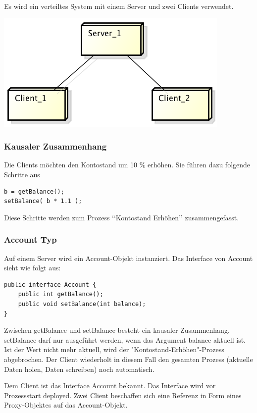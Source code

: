 \documentclass{article}
\begin{document}
Es wird ein verteiltes System mit einem Server und zwei Clients verwendet.
\begin{center}
\includegraphics[scale=0.85]{Deployment.png}
\end{center}

\subsubsection{Kausaler Zusammenhang}
\label{sec:kaus-zusamm}

Die Clients möchten den Kontostand um 10 \% erhöhen. Sie führen dazu folgende Schritte aus
\begin{lstlisting}
b = getBalance();
setBalance( b * 1.1 );
\end{lstlisting}
Diese Schritte werden zum Prozess ‘‘Kontostand Erhöhen’’ zusammengefasst.

\subsubsection{Account Typ}
\label{sec:account-typ}

Auf einem Server wird ein Account-Objekt instanziert.
Das Interface von Account sieht wie folgt aus:
\begin{lstlisting}
public interface Account {
    public int getBalance();
    public void setBalance(int balance);    
}
\end{lstlisting}
Zwischen getBalance und setBalance besteht ein kausaler Zusammenhang. setBalance darf nur ausgeführt werden, wenn das Argument balance aktuell ist. Ist der Wert nicht mehr aktuell, wird der "Kontostand-Erhöhen"-Prozess abgebrochen. Der Client wiederholt in diesem Fall den gesamten Prozess (aktuelle Daten holen, Daten schreiben) noch automatisch.

Dem Client ist das Interface Account bekannt. Das Interface wird vor Prozessstart deployed.
Zwei Client beschaffen sich eine Referenz in Form eines Proxy-Objektes auf das Account-Objekt. 
\end{document}
